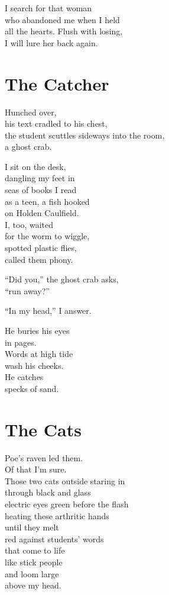 \documentclass[twoside,10pt]{book}
\begin{document}
I search for that woman\\
who abandoned me when I held\\
all the hearts. Flush with losing,\\
I will lure her back again.


\clearpage
\section{The Catcher}

Hunched over,\\
his text cradled to his chest,\\
the student scuttles sideways into the room,\\
a ghost crab.

I sit on the desk,\\
dangling my feet in\\
seas of books I read\\
as a teen, a fish hooked\\
on Holden Caulfield.\\
I, too, waited\\
for the worm to wiggle,\\
spotted plastic flies,\\
called them phony.

``Did you,'' the ghost crab asks,\\
``run away?''

``In my head,'' I answer.

He buries his eyes\\
in pages.\\
Words at high tide\\
wash his cheeks.\\
He catches\\
specks of sand.


\clearpage
\section{The Cats}

Poe's raven led them.\\
Of that I'm sure.\\
Those two cats outside staring in\\
through black and glass\\
electric eyes green before the flash\\
heating these arthritic hands\\
until they melt\\
red against students' words\\
that come to life\\
like stick people\\
and loom large\\
above my head.
\end{document}
